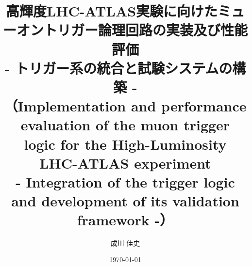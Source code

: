 \title{\huge 高輝度LHC-ATLAS実験に向けたミューオントリガー論理回路の実装及び性能評価\\- トリガー系の統合と試験システムの構築 - \vspace{1cm}\\ \Large（Implementation and performance evaluation of the muon trigger logic for
the High-Luminosity LHC-ATLAS experiment \\- Integration of the trigger
logic and development of its validation framework -）} %
\date{\today} %
\author{成川 佳史} %
\seifuku{} %
